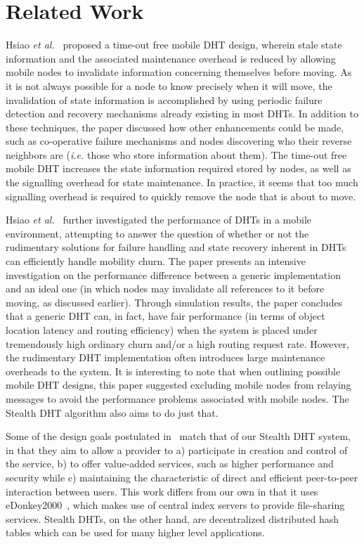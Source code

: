 \documentclass[conference]{IEEEtran}
\begin{document}
\section{Related Work} \label{sect-related}
Hsiao {\em et al.}~\cite{towardsmobile} proposed a time-out free
mobile DHT design, wherein stale state information and the
associated maintenance overhead is reduced by allowing mobile nodes
to invalidate information concerning themselves before moving. As it
is not always possible for a node to know precisely when it will
move, the invalidation of state information is accomplished by using
periodic failure detection and recovery mechanisms already existing
in most DHTs. In addition to these techniques, the paper discussed
how other enhancements could be made, such as co-operative failure
mechanisms and nodes discovering who their reverse neighbors are
({\em i.e.} those who store information about them). The time-out
free mobile DHT increases the state information required stored by
nodes, as well as the signalling overhead for state maintenance. In
practice, it seems that too much signalling overhead is required to
quickly remove the node that is about to move.

Hsiao {\em et al.}~\cite{mobilechurn} further investigated the
performance of DHTs in a mobile environment, attempting to answer
the question of whether or not the rudimentary solutions for failure
handling and state recovery inherent in DHTs can efficiently handle
mobility churn. The paper presents an intensive investigation on the
performance difference between a generic implementation and an ideal
one (in which nodes may invalidate all references to it before
moving, as discussed earlier). Through simulation results, the paper
concludes that a generic DHT can, in fact, have fair performance (in
terms of object location latency and routing efficiency) when the
system is placed under tremendously high ordinary churn and/or a
high routing request rate. However, the rudimentary DHT
implementation often introduces large maintenance overheads to the
system. It is interesting to note that when outlining possible
mobile DHT designs, this paper suggested excluding mobile nodes from
relaying messages to avoid the performance problems associated with
mobile nodes. The Stealth DHT algorithm also aims to do just that.

Some of the design goals postulated
in~\cite{mobilep2p1}\cite{mobilep2p2} match that of our Stealth DHT
system, in that they aim to allow a provider to a) participate in
creation and control of the service, b) to offer value-added
services, such as higher performance and security while c)
maintaining the characteristic of direct and efficient peer-to-peer
interaction between users. This work differs from our own in that it
uses eDonkey2000~\cite{donkey}, which makes use of central index
servers to provide file-sharing services. Stealth DHTs, on the other
hand, are decentralized distributed hash tables which can be used
for many higher level applications.
\end{document}
